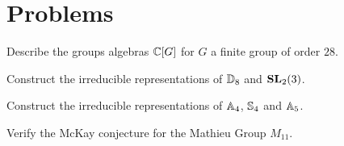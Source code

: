 \section{Problems}

\begin{prob}
	\label{prob:groupalgebra}
	Describe the groups algebras $\mathbb{C}[G]$ for $G$ a finite group of order $28$.
\end{prob}

\begin{prob}
	Construct the irreducible representations of $\mathbb{D}_8$ and $\mathbf{SL}_2(3)$.
\end{prob}

\begin{prob}
	Construct the irreducible representations of 
	$\mathbb{A}_4$, $\mathbb{S}_4$ and $\mathbb{A}_5$.
\end{prob}

\begin{prob}
	\label{prob:McKay:M11}
	Verify the McKay conjecture for the Mathieu Group $M_{11}$.
\end{prob}


